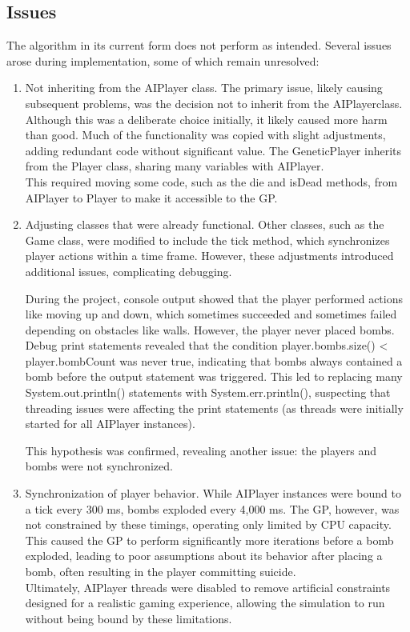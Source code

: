 \documentclass[sigconf]{acmart} %
\begin{document}
\subsection{Issues}
The algorithm in its current form does not perform as intended. Several issues arose during implementation, some of which remain unresolved: 
\begin{enumerate}
      \item Not inheriting from the AIPlayer class. 
      The primary issue, likely causing subsequent problems, was the decision not to inherit from the AIPlayerclass. Although this was a deliberate choice initially, it likely caused more harm than good. Much of the functionality was copied with slight adjustments, adding redundant code without significant value. The GeneticPlayer inherits from the Player class, sharing many variables with AIPlayer. \\ 
This required moving some code, such as the die and isDead methods, from AIPlayer to Player to make it accessible to the GP.
      \item Adjusting classes that were already functional. 
      Other classes, such as the Game class, were modified to include the tick method, which synchronizes player actions within a time frame. However, these adjustments introduced additional issues, complicating debugging. 
	  
	During the project, console output showed that the player performed actions like moving up and down, which sometimes succeeded and sometimes failed depending on obstacles like walls. However, the player never placed bombs. Debug print statements revealed that the condition player.bombs.size() < player.bombCount was never true, indicating that bombs always contained a bomb before the output statement was triggered. This led to replacing many System.out.println() statements with System.err.println(), suspecting that threading issues were affecting the print statements (as threads were initially started for all AIPlayer instances). 
 
 This hypothesis was confirmed, revealing another issue: the players and bombs were not synchronized.
      \item Synchronization of player behavior. 
      While AIPlayer instances were bound to a tick every 300 ms, bombs exploded every 4,000 ms. The GP, however, was not constrained by these timings, operating only limited by CPU capacity. This caused the GP to perform significantly more iterations before a bomb exploded, leading to poor assumptions about its behavior after placing a bomb, often resulting in the player committing suicide. \\ 
	  Ultimately, AIPlayer threads were disabled to remove artificial constraints designed for a realistic gaming experience, allowing the simulation to run without being bound by these limitations. 
   

\end{enumerate}
\end{document}
